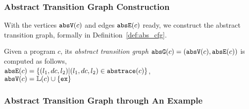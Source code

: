 \subsubsection{Abstract Transition Graph Construction} 
With the vertices $\mathtt{abs}{\mathtt{V}}(c)$ and edges $\mathtt{abs}{\mathtt{E}}(c)$ ready, we construct the abstract transition graph, formally in
Definition~\ref{def:abs_cfg}.
%
\begin{defn}
\label{def:abs_cfg}
Given a program $c$, 
its \emph{abstract transition graph} $\mathtt{abs}{\mathtt{G}}(c) =(\mathtt{abs}{\mathtt{V}}(c), \mathtt{abs}{\mathtt{E}}(c))$ is computed as follows,
\\
$\mathtt{abs}{\mathtt{E}}(c) = \{(l_1, dc, l_2) | (l_1, dc, l_2) \in \mathtt{abs}{\mathtt{trace}}(c)\}$,
\\
$\mathtt{abs}{\mathtt{V}}(c) = \mathbb{L}(c)\cup\{\mathtt{ex}\}$
\end{defn}
%
\subsubsection{Abstract Transition Graph through An Example}
\label{sec:abscfg_example}
% 
%

%
